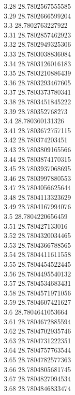 {3.28	28.7802567555585\\
3.29	28.7802666599204\\
3.3	28.7802763227922\\
3.31	28.7802857462923\\
3.32	28.7802949325306\\
3.33	28.7803038836084\\
3.34	28.7803126016183\\
3.35	28.7803210886439\\
3.36	28.7803293467605\\
3.37	28.7803373780341\\
3.38	28.7803451845222\\
3.39	28.780352768273\\
3.4	28.780360131326\\
3.41	28.7803672757115\\
3.42	28.780374203451\\
3.43	28.7803809165566\\
3.44	28.7803874170315\\
3.45	28.7803937068695\\
3.46	28.7803997880553\\
3.47	28.7804056625644\\
3.48	28.7804113323629\\
3.49	28.7804167994076\\
3.5	28.7804220656459\\
3.51	28.780427133016\\
3.52	28.7804320034465\\
3.53	28.7804366788565\\
3.54	28.7804411611558\\
3.55	28.7804454522445\\
3.56	28.7804495540132\\
3.57	28.7804534683431\\
3.58	28.7804571971056\\
3.59	28.7804607421627\\
3.6	28.7804641053664\\
3.61	28.7804672885594\\
3.62	28.7804702935746\\
3.63	28.7804731222351\\
3.64	28.7804757763544\\
3.65	28.7804782577363\\
3.66	28.7804805681745\\
3.67	28.7804827094534\\
3.68	28.7804846833474\\
}
